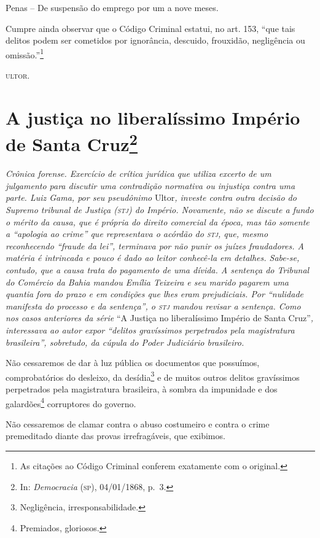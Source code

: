 Penas -- De suspensão do emprego por um a nove meses.

Cumpre ainda observar que o Código Criminal estatui, no art. 153, ``que
tais delitos podem ser cometidos por ignorância, descuido, frouxidão,
negligência ou omissão.''\footnote{As citações ao Código Criminal
  conferem exatamente com o original.}

\textsc{ultor}.

\chapter{A justiça no liberalíssimo Império de Santa Cruz\footnote{In: \emph{Democracia} (\textsc{sp}), 04/01/1868, p.~3.}}

\begin{didascalia}
\emph{Crônica forense. Exercício de crítica jurídica que utiliza excerto
de um julgamento para discutir uma contradição normativa ou injustiça
contra uma parte. Luiz Gama, por seu pseudônimo} Ultor\emph{, investe
contra outra decisão do Supremo tribunal de Justiça (\textsc{stj}) do Império.
Novamente, não se discute a fundo o mérito da causa, que é própria do
direito comercial da época, mas tão somente a ``apologia ao crime'' que
representava o acórdão do \textsc{stj}, que, mesmo reconhecendo ``fraude da lei'',
terminava por não punir os juízes fraudadores. A matéria é intrincada e
pouco é dado ao leitor conhecê-la em detalhes. Sabe-se, contudo, que a
causa trata do pagamento de uma dívida. A sentença do Tribunal do
Comércio da Bahia mandou Emília Teixeira e seu marido pagarem uma
quantia fora do prazo e em condições que lhes eram prejudiciais. Por
``nulidade manifesta do processo e da sentença'', o \textsc{stj} mandou revisar a
sentença. Como nos casos anteriores da série} ``A Justiça no
liberalíssimo Império de Santa Cruz''\emph{, interessava ao autor expor
``delitos gravíssimos perpetrados pela magistratura brasileira'',
sobretudo, da cúpula do Poder Judiciário brasileiro.}
\end{didascalia}

Não cessaremos de dar à luz pública os documentos que possuímos,
comprobatórios do desleixo, da desídia\footnote{Negligência,
  irresponsabilidade.} e de muitos outros delitos gravíssimos
perpetrados pela magistratura brasileira, à sombra da impunidade e dos
galardões\footnote{Premiados, gloriosos.} corruptores do governo.

Não cessaremos de clamar contra o abuso costumeiro e contra o crime
premeditado diante das provas irrefragáveis, que exibimos.

